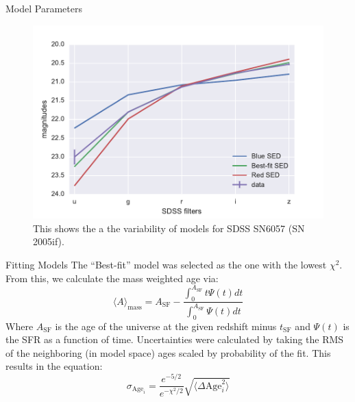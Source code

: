 \documentclass[final]{beamer}
\newlength{\onecolwid}
\begin{document}
\begin{frame}[t]
\begin{columns}[t]
\begin{column}{\onecolwid}
\begin{block}{Model Parameters}
\begin{figure}
    \begin{minipage}[c]{0.55\onecolwid}
        \includegraphics[width=0.67\onecolwid]{SN6057-Model-Variability.pdf}
    \end{minipage}\hfill
    \begin{minipage}[c]{0.3\onecolwid}
    \caption{This shows the a the variability of models for SDSS SN6057 (SN 2005if).} \label{fig:diverse}
  \end{minipage}
\end{figure}

\begin{block}{Fitting Models}
The ``Best-fit'' model was selected as the one with the lowest $\chi^2$. From this, we calculate the mass weighted age via:
\begin{equation}
    \langle A \rangle_{\text{mass}}= A_{\text{SF}} - \frac{\int^{A_{\text{SF}}}_{0}t\Psi(t)dt}{\int^{A_{\text{SF}}}_{0}\Psi(t)dt}
\end{equation}
Where $A_{\text{SF}}$ is the age of the universe at the given redshift minus $t_{\text{SF}}$ and $\Psi(t)$ is the SFR as a function of time.
Uncertainties were calculated by taking the RMS of the neighboring (in model space) ages scaled by probability of the fit. This results in the equation:
\begin{equation}
    \sigma_{\text{Age}_{i}} = \frac{e^{-5/2}}{e^{-\chi^2/2}} \sqrt{\langle \Delta \text{Age}_i^2\rangle}
\end{equation}
\end{block}



\end{block}
\end{column}
\end{columns}
\end{frame}
\end{document}
